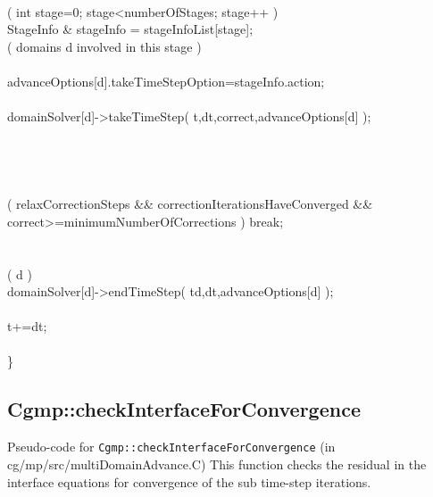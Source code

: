 \begin{flushleft}
\ic \\ 
\ic      \FOR( int stage=0; stage<numberOfStages; stage++ )  \\
\id        StageInfo \& stageInfo = stageInfoList[stage];  \\
\id        \FOR( domains d involved in this stage ) \\
\ie          {} \\
\ie          advanceOptions[d].takeTimeStepOption=stageInfo.action; \\
\ie \\
\ie          domainSolver[d]->takeTimeStep( t,dt,correct,advanceOptions[d] ); \\
\ie \\
\id         \END \\
\ic       \END \\
\ic       {} \\
\ic       \IF( relaxCorrectionSteps \&\& correctionIterationsHaveConverged \&\& \\
\ic            \qquad correct>=minimumNumberOfCorrections ) break; \\
\ib     \END \\ 
\ib \\
\ib   \ForDomain( d ) \\
\ic      domainSolver[d]->endTimeStep( td,dt,advanceOptions[d] ); \\
\ib   \END \\
\ib   t+=dt;  \\
\ia \END \\
\}
\end{flushleft}


\clearpage
\subsection{Cgmp::checkInterfaceForConvergence}
Pseudo-code for {\tt Cgmp::checkInterfaceForConvergence} (in cg/mp/src/multiDomainAdvance.C)
This function checks the residual in the interface equations for convergence of the sub time-step iterations.


